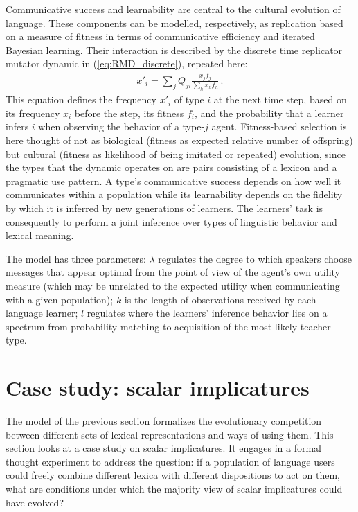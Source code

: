 \documentclass[a4paper, 11pt]{article}
\theoremstyle{Satz}
\begin{document}
Communicative success and learnability are central to the cultural evolution of language. These
components can be modelled, respectively, as replication based on a measure of fitness in terms
of communicative efficiency and iterated Bayesian learning. Their interaction is described by
the discrete time replicator mutator dynamic in (\ref{eq:RMD_discrete}), repeated here:
\begin{align*}
  x'_i = \sum_j Q_{ji} \frac{x_jf_j}{\sum_h x_h f_h}\,.
\end{align*}
This equation defines the frequency $x'_i$ of type $i$ at the next time step, based on its
frequency $x_i$ before the step, its fitness $f_i$, and the probability that a learner infers
$i$ when observing the behavior of a type-$j$ agent. Fitness-based selection is here thought of
not as biological (fitness as expected relative number of offspring) but cultural (fitness as
likelihood of being imitated or repeated) evolution, since the types that the dynamic operates
on are pairs consisting of a lexicon and a pragmatic use pattern. A type's communicative success depends
on how well it communicates within a population while its learnability depends on the
fidelity by which it is inferred by new generations of learners. The learners' task is
consequently to perform a joint inference over types of linguistic behavior and lexical
meaning.

The model has three parameters: $\lambda$ regulates the degree to which speakers
choose messages that appear optimal from the point of view of the agent's own utility measure
(which may be unrelated to the expected utility when communicating with a given population);
$k$ is the length of observations received by each language learner; $l$ regulates where the learners'
inference behavior lies on a spectrum from probability matching to acquisition of the most likely
teacher type.





\section{Case study: scalar implicatures}
\label{sec:si-case-study}

The model of the previous section formalizes the evolutionary competition between different
sets of lexical representations and ways of using them. This section looks at a case study on
scalar implicatures. It engages in a formal thought experiment to address the
question: if a population of language users could freely combine different lexica with
different dispositions to act on them, what are conditions under which the majority view of scalar
implicatures could have evolved?
\end{document}
